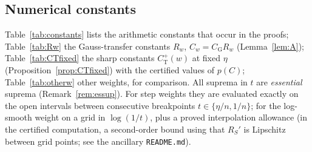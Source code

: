 \providecommand{\Ec}{\mathcal{E}}
\providecommand{\CG}{C_{\mathrm G}}
\providecommand{\CT}{C_{\mathrm T}}
\providecommand{\CTp}{C^{+}_{\mathrm T}}
\providecommand{\Rw}{R_w}
\providecommand{\Cw}{C_w}

\subsection{Numerical constants}

Table~\ref{tab:constants} lists the arithmetic constants that occur in the proofs; Table~\ref{tab:Rw} the Gauss-transfer
constants $\Rw$, $\Cw=\CG\Rw$ (Lemma~\ref{lem:A}); Table~\ref{tab:CTfixed} the sharp constants $\CTp(w)$ at fixed $\eta$
(Proposition~\ref{prop:CTfixed}) with the certified values of $p(C)$; Table~\ref{tab:otherw} other weights, for comparison.
All suprema in $t$ are \emph{essential} suprema (Remark~\ref{rem:essup}). For step weights they are evaluated exactly on the
open intervals between consecutive breakpoints $t\in\{\eta/n,1/n\}$; for the log-smooth weight on a grid in $\log(1/t)$, plus a
proved interpolation allowance (in the certified computation, a second-order bound using that $R_S'$ is Lipschitz between grid points;
see the ancillary \texttt{README.md}).

